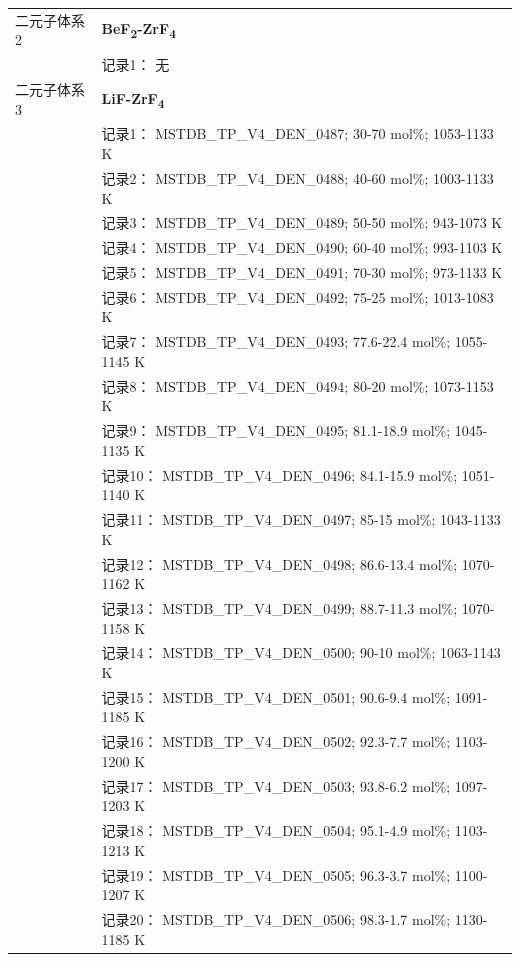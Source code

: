 \documentclass[12pt]{article}
\begin{document}
{\begin{longtable}[]{@{}
  >{\raggedright\arraybackslash}p{}
  >{\raggedright\arraybackslash}p{}@{}}
二元子体系 2 & \textbf{BeF\textsubscript{2}-ZrF\textsubscript{4}} \\
 & 记录1： 无 \\
二元子体系 3  & \textbf{LiF-ZrF\textsubscript{4}} \\
 & 记录1： MSTDB\_TP\_V4\_DEN\_0487; 30-70 mol\%; 1053-1133 K \\
 & 记录2： MSTDB\_TP\_V4\_DEN\_0488; 40-60 mol\%; 1003-1133 K \\
 & 记录3： MSTDB\_TP\_V4\_DEN\_0489; 50-50 mol\%; 943-1073 K \\
 & 记录4： MSTDB\_TP\_V4\_DEN\_0490; 60-40 mol\%; 993-1103 K \\
 & 记录5： MSTDB\_TP\_V4\_DEN\_0491; 70-30 mol\%; 973-1133 K \\
 & 记录6： MSTDB\_TP\_V4\_DEN\_0492; 75-25 mol\%; 1013-1083 K \\
 & 记录7： MSTDB\_TP\_V4\_DEN\_0493; 77.6-22.4 mol\%; 1055-1145 K \\
 & 记录8： MSTDB\_TP\_V4\_DEN\_0494; 80-20 mol\%; 1073-1153 K \\
 & 记录9： MSTDB\_TP\_V4\_DEN\_0495; 81.1-18.9 mol\%; 1045-1135 K \\
 & 记录10： MSTDB\_TP\_V4\_DEN\_0496; 84.1-15.9 mol\%; 1051-1140 K \\
 & 记录11： MSTDB\_TP\_V4\_DEN\_0497; 85-15 mol\%; 1043-1133 K \\
 & 记录12： MSTDB\_TP\_V4\_DEN\_0498; 86.6-13.4 mol\%; 1070-1162 K \\
 & 记录13： MSTDB\_TP\_V4\_DEN\_0499; 88.7-11.3 mol\%; 1070-1158 K \\
 & 记录14： MSTDB\_TP\_V4\_DEN\_0500; 90-10 mol\%; 1063-1143 K \\
 & 记录15： MSTDB\_TP\_V4\_DEN\_0501; 90.6-9.4 mol\%; 1091-1185 K \\
 & 记录16： MSTDB\_TP\_V4\_DEN\_0502; 92.3-7.7 mol\%; 1103-1200 K \\
 & 记录17： MSTDB\_TP\_V4\_DEN\_0503; 93.8-6.2 mol\%; 1097-1203 K \\
 & 记录18： MSTDB\_TP\_V4\_DEN\_0504; 95.1-4.9 mol\%; 1103-1213 K \\
 & 记录19： MSTDB\_TP\_V4\_DEN\_0505; 96.3-3.7 mol\%; 1100-1207 K \\
 & 记录20： MSTDB\_TP\_V4\_DEN\_0506; 98.3-1.7 mol\%; 1130-1185 K  \\


\end{longtable}}
\end{document}
